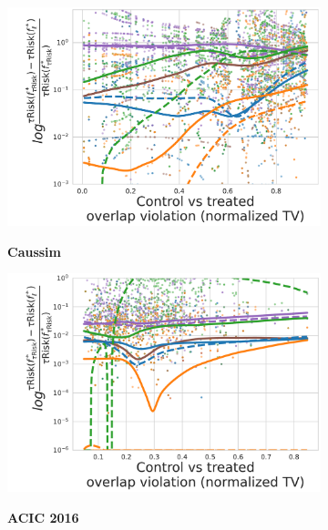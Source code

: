 \documentclass[a4paper,num-refs]{oup-contemporary}%
\begin{document}
\begin{figure}
    \centering
    \begin{subfigure}[b]{0.44\textwidth}
        \centering
        \caption{\textbf{Caussim}}
        \includegraphics[width=\textwidth]{norm_bias_trisk_tobest_caussim_nuis_nlin_models_ridge.pdf}
        \label{fig:normalized_bias_tau_risk_to_best_method_caussim}
    \end{subfigure}
    \hfill
    \begin{subfigure}[b]{0.44\textwidth}
        \centering
        \caption{\textbf{ACIC 2016}}
        \includegraphics[width=\textwidth]{norm_bias_trisk_tobest_acic2016_nuis_nlin_models_hgb.pdf}
        \label{fig:normalized_bias_tau_risk_to_best_method_acic_2016}
    \end{subfigure}
    \hfill
    \begin{subfigure}[b]{0.10\textwidth}

\end{subfigure}
\end{figure}
\end{document}
